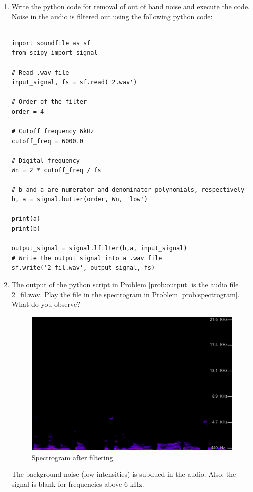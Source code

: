 \documentclass[journal,12pt,twocolumn]{IEEEtran}
\theoremstyle{remark}
\renewcommand\thesection{\arabic{section}}
\numberwithin{equation}{subsection}
\begin{document}
\begin{enumerate}[label=\thesection.\arabic*
,ref=\thesection.\theenumi]
\item
\label{prob:output}
Write the python code for removal of out of band noise and execute the code.
\\

\solution Noise in the audio is     filtered out using the following python code:
\begin{lstlisting}

import soundfile as sf
from scipy import signal

# Read .wav file
input_signal, fs = sf.read('2.wav')

# Order of the filter
order = 4

# Cutoff frequency 6kHz
cutoff_freq = 6000.0

# Digital frequency
Wn = 2 * cutoff_freq / fs

# b and a are numerator and denominator polynomials, respectively
b, a = signal.butter(order, Wn, 'low')

print(a)
print(b)

output_signal = signal.lfilter(b,a, input_signal)
# Write the output signal into a .wav file
sf.write('2_fil.wav', output_signal, fs)
\end{lstlisting} \label{py:filter}

\item
The output of the python script in Problem \ref{prob:output} is the audio file 2\_fil.wav. Play the file in the spectrogram in Problem \ref{prob:spectrogram}. What do you observe?
\\

\solution 
\begin{figure}[!h]
    \centering
    \includegraphics[width = \columnwidth]{figs/filtered.png}
    \caption{Spectrogram after filtering}
    \label{fig:2.3}
\end{figure}

The background noise (low intensities) is subdued in the audio.  Also,  the signal is blank for frequencies above 6 kHz.

\end{enumerate}
\end{document}
